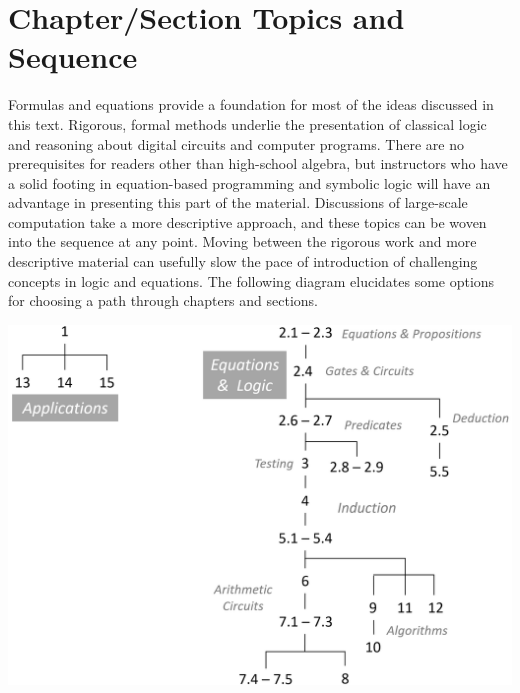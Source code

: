 \chapter{Chapter/Section Topics and Sequence}
\label{ch:roadmap}

Formulas and equations provide a foundation
for most of the ideas discussed in this text.
Rigorous, formal methods underlie the presentation of classical logic
and reasoning about digital circuits and computer programs.
There are no prerequisites for readers other than high-school algebra,
but instructors who have a solid footing in equation-based programming
and symbolic logic will have an advantage in presenting this part of the material.
Discussions of large-scale computation take a more descriptive approach,
and these topics can be woven into the sequence at any point.
Moving between the rigorous work and more descriptive material
can usefully slow the pace of introduction
of challenging concepts in logic and equations.
The following diagram elucidates some options for choosing a
path through chapters and sections.
\vspace{1cm}
\label{diagram:roadmap}
\begin{center}
\includegraphics[scale=0.25]{images/roadmap.png}
\end{center}


